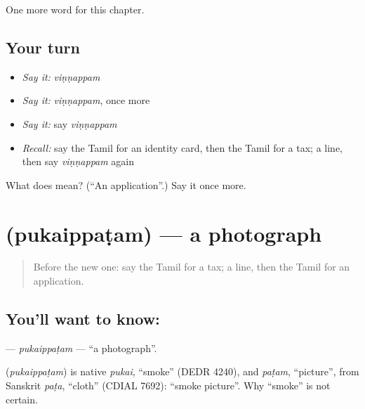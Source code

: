 \begin{grammarlens}[title={What you've built}]
One more word for this chapter.
\end{grammarlens}

\subsection*{Your turn}
\begin{itemize}
\raggedright
  \item \emph{Say it:} \emph{viṇṇappam}
  \item \emph{Say it:} \emph{viṇṇappam}, once more
  \item \emph{Say it:} say \emph{viṇṇappam}
  \item \emph{Recall:} say the Tamil for an identity card, then the Tamil for a tax; a line, then say \emph{viṇṇappam} again
\end{itemize}

\begin{tcolorbox}[breakable,colback=teal!4,colframe=teal!35!black,title={Before you move on}]
What does  mean? (\textquotedblleft{}An application\textquotedblright{}.) Say it once more.
\end{tcolorbox}
\section[\texorpdfstring{\ta{புகைப்படம்} (pukaippaṭam)}{புகைப்படம் (pukaippaṭam)}]{ (pukaippaṭam) — a photograph}

\label{lesson:TA-C272-pukaippatam}



\begin{quote}
Before the new one: say the Tamil for a tax; a line, then the Tamil for an application.
\end{quote}

\subsection*{You'll want to know: }
\textbf{} — \emph{pukaippaṭam} — \textquotedblleft{}a photograph\textquotedblright{}.

\begin{cousinweb}
\textbf{} (\emph{pukaippaṭam}) is native \emph{pukai}, \textquotedblleft{}smoke\textquotedblright{} (DEDR 4240), and \emph{paṭam}, \textquotedblleft{}picture\textquotedblright{}, from Sanskrit \emph{paṭa}, \textquotedblleft{}cloth\textquotedblright{} (CDIAL 7692): \textquotedblleft{}smoke picture\textquotedblright{}. Why \textquotedblleft{}smoke\textquotedblright{} is not certain.
\end{cousinweb}

